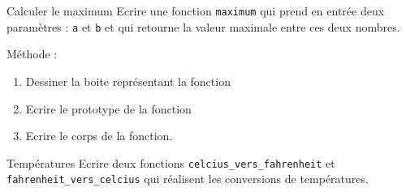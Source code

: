 \begin{UPSTIexercice}{Calculer le maximum}
	Ecrire une fonction \texttt{maximum} qui prend en entrée deux paramètres : \texttt{a} et \texttt{b} et qui retourne la valeur maximale entre ces deux nombres.

	Méthode : 
	\begin{enumerate}
		\item Dessiner la boite représentant la fonction
		\item Ecrire le prototype de la fonction
		\item Ecrire le corps de la fonction.
	\end{enumerate}
\end{UPSTIexercice}

\begin{UPSTIexercice}{Températures}
	Ecrire deux fonctions \texttt{celcius\_vers\_fahrenheit} et \texttt{fahrenheit\_vers\_celcius} qui réalisent les conversions de températures.
\end{UPSTIexercice} 



 
